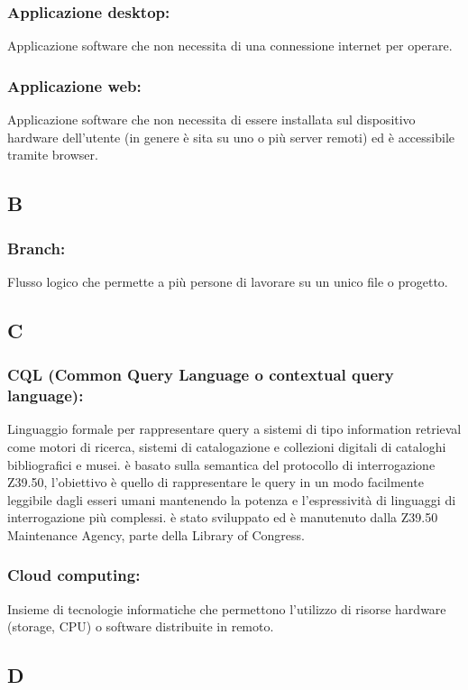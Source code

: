 \subsubsection*{Applicazione desktop:} Applicazione software che non necessita
di una connessione internet per operare.

\subsubsection*{Applicazione web:} Applicazione software che non necessita di
essere installata sul dispositivo hardware dell'utente (in genere \`e sita su uno o pi\`u server
remoti) ed \`e accessibile tramite browser.

\subsection*{B}
\subsubsection*{Branch:}  Flusso logico che permette a pi\`u persone di lavorare
su un unico file o progetto.
\subsection*{C}
\subsubsection*{CQL (Common Query Language o contextual query language):}
Linguaggio formale per rappresentare query a sistemi di tipo information
retrieval come motori di ricerca, sistemi di catalogazione e collezioni digitali di cataloghi
bibliografici e musei. \`e basato sulla semantica del protocollo di interrogazione
Z39.50, l'obiettivo \`e quello di rappresentare le query in un modo facilmente
leggibile dagli esseri umani mantenendo la potenza e l'espressivit\`a di linguaggi
di interrogazione pi\`u complessi. \`e stato sviluppato ed \`e manutenuto dalla Z39.50
Maintenance Agency, parte della Library of Congress.

\subsubsection*{Cloud computing:} Insieme di tecnologie informatiche che
permettono l'utilizzo di risorse hardware (storage, CPU) o software distribuite in remoto.

\subsection*{\huge{D}}
